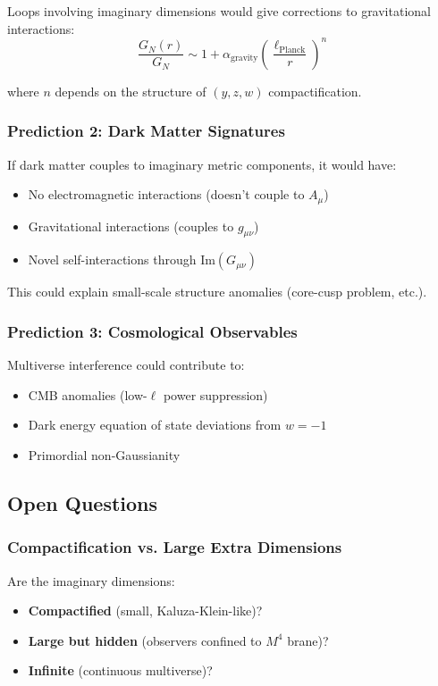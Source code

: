 Loops involving imaginary dimensions would give corrections to gravitational interactions:
\begin{equation}
\frac{G_N(r)}{G_N} \sim 1 + \alpha_{\text{gravity}} \left(\frac{\ell_{\text{Planck}}}{r}\right)^n
\end{equation}

where $n$ depends on the structure of $(y, z, w)$ compactification.

\subsubsection{Prediction 2: Dark Matter Signatures}

If dark matter couples to imaginary metric components, it would have:
\begin{itemize}
\item No electromagnetic interactions (doesn't couple to $A_{\mu}$)
\item Gravitational interactions (couples to $g_{\mu\nu}$)
\item Novel self-interactions through $\text{Im}(G_{\mu\nu})$
\end{itemize}

This could explain small-scale structure anomalies (core-cusp problem, etc.).

\subsubsection{Prediction 3: Cosmological Observables}

Multiverse interference could contribute to:
\begin{itemize}
\item CMB anomalies (low-$\ell$ power suppression)
\item Dark energy equation of state deviations from $w = -1$
\item Primordial non-Gaussianity
\end{itemize}

\subsection{Open Questions}

\subsubsection{Compactification vs. Large Extra Dimensions}

Are the imaginary dimensions:
\begin{itemize}
\item \textbf{Compactified} (small, Kaluza-Klein-like)?
\item \textbf{Large but hidden} (observers confined to $M^4$ brane)?
\item \textbf{Infinite} (continuous multiverse)?
\end{itemize}

